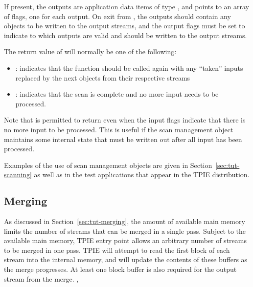 \begin{itemize}
    If present, the outputs  are
    application data items of type , and
     points to an array of flags, one for each
    output. On exit from , the outputs
    should contain any objects to be written to the output
    streams, and the output flags must be set to indicate to
     which outputs are valid and should
    be written to the output streams.
    
    The return value of  will normally be
    one of the following:
    \begin{itemize}
        \item {}:
         indicates that
        the function should be called again with any
        ``taken'' inputs replaced by the next objects from
        their respective streams
        \item {}: indicates that the
        scan is complete and no more input needs to be
        processed.
    \end{itemize}
    
    Note that  is permitted to return
     even when the input flags
    indicate that there is no more input to be processed.
    This is useful if the scan management object maintains
    some internal state that must be written out after all
    input has been processed.  

\end{itemize}

Examples of the use of scan management objects are given in
Section~\ref{sec:tut-scanning} as well as in the test applications that
appear in the TPIE distribution.



\subsection{Merging}

As discussed in Section~\ref{sec:tut-merging}, the amount of
available main memory limits the number of streams that can
be merged in a single pass. Subject to the available main
memory, TPIE entry point 
allows an arbitrary number of streams to be merged in one
pass. TPIE will attempt to read the first block of each
stream into the internal memory, and will update the
contents of these buffers as the merge progresses. At least
one block buffer is also required for the output stream from
the merge.  ,

